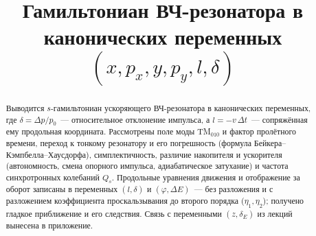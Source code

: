 \documentclass[a4paper,11pt]{article}
\title{Гамильтониан ВЧ-резонатора в канонических переменных $(x,p_x,y,p_y,l,\delta)$}
\author{}
\date{}
\numberwithin{equation}{section}
\begin{document}
\maketitle

\begin{abstract}
Выводится $s$-гамильтониан ускоряющего ВЧ-резонатора в канонических переменных, где $\delta=\Delta p/p_0$~---
относительное отклонение импульса, а $l=-v\,\Delta t$~--- сопряжённая ему продольная координата. Рассмотрены поле
моды TM$_{010}$ и фактор пролётного времени, переход к тонкому резонатору и его погрешность (формула
Бейкера--Кэмпбелла--Хаусдорфа), симплектичность, различие накопителя и ускорителя (автономность, смена опорного
импульса, адиабатическое затухание) и частота синхротронных колебаний $Q_s$. Продольные уравнения движения и
отображение за оборот записаны в переменных $(l,\delta)$ и $(\varphi,\Delta E)$~--- без разложения и с разложением
коэффициента проскальзывания до второго порядка ($\eta_1,\eta_2$); получено гладкое приближение и его следствия.
Связь с переменными $(z,\delta_E)$ из лекций~\cite{wolski4,wolski7} вынесена в приложение.
\end{abstract}
\end{document}

